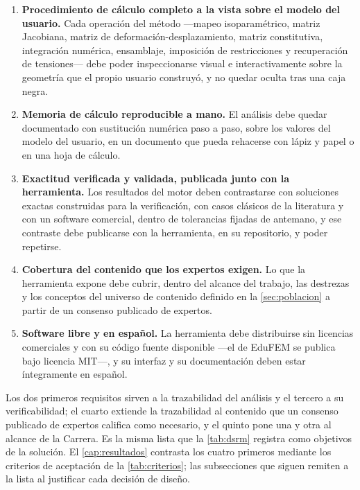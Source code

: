 \begin{enumerate}
    \item \textbf{Procedimiento de cálculo completo a la vista sobre el modelo del usuario.} Cada operación del método —mapeo isoparamétrico, matriz Jacobiana, matriz de deformación-desplazamiento, matriz constitutiva, integración numérica, ensamblaje, imposición de restricciones y recuperación de tensiones— debe poder inspeccionarse visual e interactivamente sobre la geometría que el propio usuario construyó, y no quedar oculta tras una caja negra.
    \item \textbf{Memoria de cálculo reproducible a mano.} El análisis debe quedar documentado con sustitución numérica paso a paso, sobre los valores del modelo del usuario, en un documento que pueda rehacerse con lápiz y papel o en una hoja de cálculo.
    \item \textbf{Exactitud verificada y validada, publicada junto con la herramienta.} Los resultados del motor deben contrastarse con soluciones exactas construidas para la verificación, con casos clásicos de la literatura y con un software comercial, dentro de tolerancias fijadas de antemano, y ese contraste debe publicarse con la herramienta, en su repositorio, y poder repetirse.
    \item \textbf{Cobertura del contenido que los expertos exigen.} Lo que la herramienta expone debe cubrir, dentro del alcance del trabajo, las destrezas y los conceptos del universo de contenido definido en la \autoref{sec:poblacion} a partir de un consenso publicado de expertos.
    \item \textbf{Software libre y en español.} La herramienta debe distribuirse sin licencias comerciales y con su código fuente disponible ---el de EduFEM se publica bajo licencia MIT---, y su interfaz y su documentación deben estar íntegramente en español.
\end{enumerate}

Los dos primeros requisitos sirven a la trazabilidad del análisis y el tercero a su verificabilidad; el cuarto extiende la trazabilidad al contenido que un consenso publicado de expertos califica como necesario, y el quinto pone una y otra al alcance de la Carrera. Es la misma lista que la \autoref{tab:dsrm} registra como objetivos de la solución. El \autoref{cap:resultados} contrasta los cuatro primeros mediante los criterios de aceptación de la \autoref{tab:criterios}; las subsecciones que siguen remiten a la lista al justificar cada decisión de diseño.

